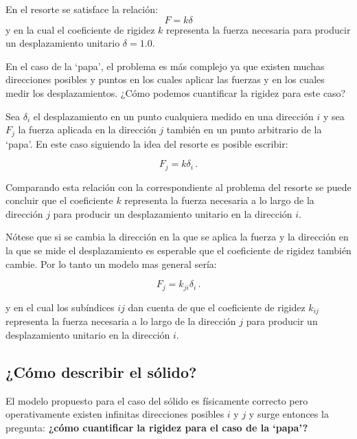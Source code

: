 En el resorte se satisface la relación:
\begin{equation*}
F = k \delta
\end{equation*}
y en la cual el coeficiente de rigidez $k$ representa la fuerza necesaria para 
producir un desplazamiento unitario $\delta = 1.0$.

En el caso de la `papa', el problema es más complejo ya que existen muchas 
direcciones posibles y puntos en los cuales aplicar las fuerzas y en los cuales 
medir los desplazamientos. ¿Cómo podemos cuantificar la rigidez para este caso?

Sea $\delta _i$ el desplazamiento en un punto cualquiera medido en una 
dirección $i$ y sea $F_j$ la fuerza aplicada en la dirección $j$ también en un 
punto arbitrario de la `papa'. En este caso siguiendo la idea del resorte es 
posible escribir:

\begin{equation*}
F_j = k \delta_i\, .
\end{equation*}

Comparando esta relación con la correspondiente al problema del resorte se 
puede concluir que el coeficiente $k$ representa la fuerza necesaria a lo largo 
de la dirección $j$ para producir un desplazamiento unitario en la dirección 
$i.$


Nótese que si se cambia la dirección en la que se aplica la fuerza y la 
dirección en la que se mide el desplazamiento es esperable que el coeficiente 
de rigidez también cambie. Por lo tanto un modelo mas general sería:

\begin{equation}
F_j = k_{ji} \delta_i\, .
\end{equation}

y en el cual los subíndices $ij$ dan cuenta de que el coeficiente de rigidez 
$k_{ij}$ representa la fuerza necesaria a lo largo de la dirección $j$ para 
producir un desplazamiento unitario en la dirección $i.$

\subsection{¿Cómo describir el sólido?}

El modelo propuesto para el caso del sólido es físicamente correcto pero 
operativamente existen infinitas direcciones posibles $i$ y $j$ y surge 
entonces la pregunta: \textbf{¿cómo cuantificar la rigidez para el caso de la 
`papa'?}

